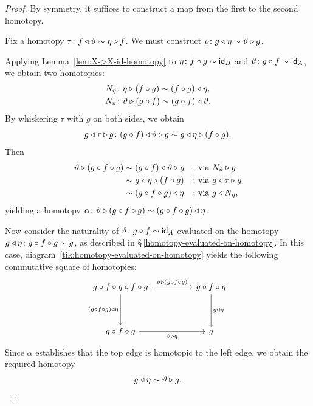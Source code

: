 \begin{proof}
    By symmetry, it suffices to construct a map from the first to the second homotopy.

    Fix a homotopy $\tau\colon f\lwct\vartheta\sim\eta\rwct f$. We must construct $\rho\colon g\lwct\eta\sim\vartheta\rwct g$.

    Applying Lemma~\ref{lem:X->X-id-homotopy} to $\eta\colon f\circ g\sim\id_B$ and $\vartheta\colon g\circ f\sim\id_A$, we obtain two homotopies:
    \begin{align*}
        N_\eta&\colon\eta\rwct(f\circ g)
            \sim(f\circ g)\lwct\eta,\\
        N_\vartheta&\colon\vartheta\rwct(g\circ f)
            \sim(g\circ f)\lwct\vartheta.
    \end{align*}
    By whiskering $\tau$ with $g$ on both sides, we obtain
    \[
        g\lwct\tau\rwct g\colon(g\circ f)\lwct\vartheta\rwct g\sim g\lwct\eta\rwct(f\circ g).
    \]
    Then
    \begin{align*}
        \vartheta\triangleright(g\circ f\circ g)
        &\sim(g\circ f)\triangleleft\vartheta\triangleright g && \text{; via $N_\vartheta\triangleright g$}\\
        &\sim g\triangleleft\eta\triangleright(f\circ g) && \text{; via $g\triangleleft\tau\triangleright g$}\\
        &\sim(g\circ f\circ g)\triangleleft\eta && \text{; via $g\triangleleft N_\eta$},
    \end{align*}
    yielding a homotopy $\alpha\colon\vartheta\rwct(g\circ f\circ g)\sim(g\circ f\circ g)\lwct\eta$.

    Now consider the naturality of $\vartheta\colon g\circ f\sim\id_A$ evaluated on the homotopy $g\lwct\eta\colon g\circ f\circ g\sim g$, as described in \S\,\ref{homotopy-evaluated-on-homotopy}. In this case, diagram~\eqref{tik:homotopy-evaluated-on-homotopy} yields the following commutative square of homotopies:
    \[
        \begin{tikzcd}[column sep=huge, row sep=huge]
            g\circ f\circ g\circ f\circ g
                \arrow[r, "\vartheta\rwct(g\circ f\circ g)"]
                \arrow[d, "(g\circ f\circ g)\lwct\eta"'] &
            g\circ f\circ g
                \arrow[d, "g\lwct\eta"] \\
            g\circ f\circ g
                \arrow[r, "\vartheta\rwct g"'] &
            g
        \end{tikzcd}
    \]
    Since $\alpha$ establishes that the top edge is homotopic to the left edge, we obtain the required homotopy
    \[
        g\triangleleft\eta \sim \vartheta\triangleright g.
    \]
\end{proof}


